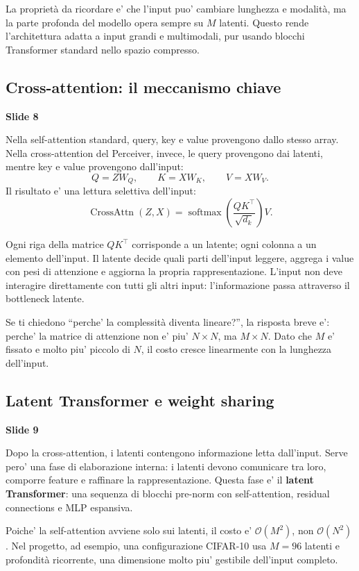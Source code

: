 \documentclass[11pt,a4paper]{article}
\newcommand{\bigO}{\mathcal{O}}
\newcommand{\softmax}{\operatorname{softmax}}
\newcommand{\slide}[1]{\textcolor{mainblue}{\textbf{Slide #1}}}
\begin{document}
La propriet\`a da ricordare e' che l'input puo' cambiare lunghezza e modalit\`a,
ma la parte profonda del modello opera sempre su $M$ latenti. Questo rende
l'architettura adatta a input grandi e multimodali, pur usando blocchi
Transformer standard nello spazio compresso.

\subsection{Cross-attention: il meccanismo chiave}
\slide{8}

Nella self-attention standard, query, key e value provengono dallo stesso
array. Nella cross-attention del Perceiver, invece, le query provengono dai
latenti, mentre key e value provengono dall'input:
\[
  Q = ZW_Q, \qquad K = XW_K, \qquad V = XW_V.
\]
Il risultato e' una lettura selettiva dell'input:
\[
  \operatorname{CrossAttn}(Z,X)
  =
  \softmax\!\left(\frac{QK^\top}{\sqrt{d_k}}\right)V.
\]

Ogni riga della matrice $QK^\top$ corrisponde a un latente; ogni colonna a un
elemento dell'input. Il latente decide quali parti dell'input leggere, aggrega
i value con pesi di attenzione e aggiorna la propria rappresentazione. L'input
non deve interagire direttamente con tutti gli altri input: l'informazione passa
attraverso il bottleneck latente.

\begin{examBox}
Se ti chiedono ``perche' la complessit\`a diventa lineare?'', la risposta breve
e': perche' la matrice di attenzione non e' piu' $N \times N$, ma $M \times N$.
Dato che $M$ e' fissato e molto piu' piccolo di $N$, il costo cresce
linearmente con la lunghezza dell'input.
\end{examBox}

\subsection{Latent Transformer e weight sharing}
\slide{9}

Dopo la cross-attention, i latenti contengono informazione letta dall'input.
Serve pero' una fase di elaborazione interna: i latenti devono comunicare tra
loro, comporre feature e raffinare la rappresentazione. Questa fase e' il
\textbf{latent Transformer}: una sequenza di blocchi pre-norm con
self-attention, residual connections e MLP espansiva.

Poiche' la self-attention avviene solo sui latenti, il costo e'
$\bigO(M^2)$, non $\bigO(N^2)$. Nel progetto, ad esempio, una configurazione
CIFAR-10 usa $M=96$ latenti e profondit\`a ricorrente, una dimensione molto
piu' gestibile dell'input completo.
\end{document}

